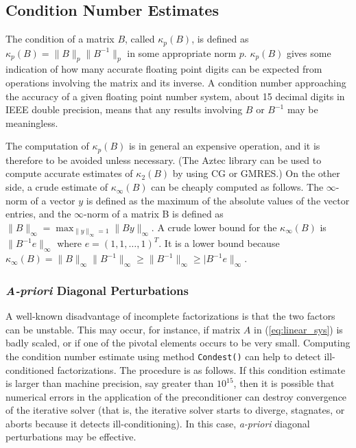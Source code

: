 \subsection{Condition Number Estimates}
\label{sec:cond}

The condition of a matrix $B$, called $\kappa_p(B)$, is defined as
$\kappa_p(B) = \|B\|_p\|B^{-1}\|_p$ in some appropriate norm $p$. 
$\kappa_p(B)$
gives some indication of how many accurate floating point
digits can be expected from operations involving the matrix and its
inverse.  A condition number approaching the accuracy of a given
floating point number system, about 15 decimal digits in IEEE double
precision, means that any results involving $B$ or $B^{-1}$ may be
meaningless.

The computation of $\kappa_p(B)$ is in general an expensive operation, and it
is therefore to be avoided unless necessary. 
(The Aztec library can be used to compute accurate estimates of 
 $\kappa_2(B)$ by using CG or GMRES.) On the other side, a crude estimate of
$\kappa_\infty(B)$ can be cheaply computed as follows.
The $\infty$-norm of a vector $y$ is defined as the maximum of the
absolute values of the vector entries, and the $\infty$-norm of a
matrix B is defined as
$\|B\|_\infty = \max_{\|y\|_\infty = 1} \|By\|_\infty$.
A crude lower bound for the $\kappa_\infty(B)$ is
$\|B^{-1}e\|_\infty$ where $e = (1, 1, \ldots, 1)^T$.  It is a
lower bound because $\kappa_\infty(B) = \|B\|_\infty\|B^{-1}\|_\infty
\ge \|B^{-1}\|_\infty \ge |B^{-1}e\|_\infty$. 

\subsubsection{{\em A-priori} Diagonal Perturbations}
\label{sec:a-priori}

A well-known disadvantage of incomplete factorizations is that the two
factors can be unstable. This may occur, for instance, if matrix $A$ in
(\ref{eq:linear_sys}) is badly scaled, or if one of the pivotal elements
occurs to be very small. Computing the condition number estimate using method
{\tt Condest()} can help to
detect ill-conditioned factorizations.  The procedure is as follows. If this
condition estimate is larger than machine precision, say greater than
$10^{15}$, then it is possible that numerical errors in the application of the
preconditioner can destroy convergence of the iterative solver (that is,
the iterative solver starts to diverge, stagnates, or aborts because it
detects ill-conditioning).  In this case, {\sl a-priori} diagonal
perturbations may be effective.  

